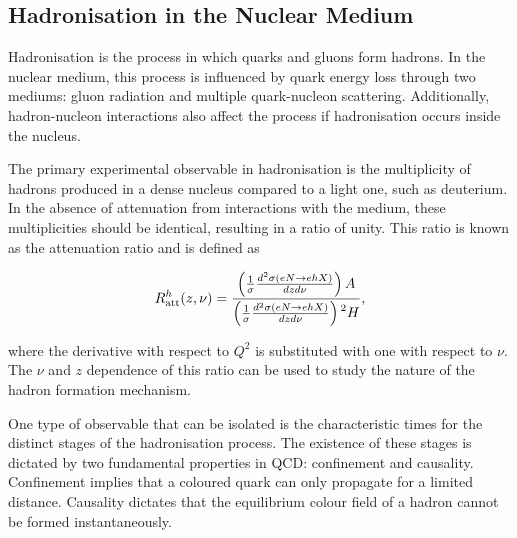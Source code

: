 \subsection{Hadronisation in the Nuclear Medium}
\label{10.30::hadronisation_in_the_nuclear_medium}
    Hadronisation is the process in which quarks and gluons form hadrons.
    In the nuclear medium, this process is influenced by quark energy loss through two mediums: gluon radiation and multiple quark-nucleon scattering.
    Additionally, hadron-nucleon interactions also affect the process if hadronisation occurs inside the nucleus.

    The primary experimental observable in hadronisation is the multiplicity of hadrons produced in a dense nucleus compared to a light one, such as deuterium.
    In the absence of attenuation from interactions with the medium, these multiplicities should be identical, resulting in a ratio of unity.
    This ratio is known as the attenuation ratio and is defined as

    \begin{equation*}
        R^h_{\text{att}}(z,\nu) = \frac
            {\left( \frac{1}{\sigma} \frac{d^2\sigma(eN \rightarrow ehX)}{dzd\nu} \right)A}
            {\left( \frac{1}{\sigma} \frac{d^2\sigma(eN \rightarrow ehX)}{dzd\nu} \right){\prescript{2}{}{H}}},
    \end{equation*}

    where the derivative with respect to $Q^2$ is substituted with one with respect to $\nu$.
    The $\nu$ and $z$ dependence of this ratio can be used to study the nature of the hadron formation mechanism.

    One type of observable that can be isolated is the characteristic times for the distinct stages of the hadronisation process.
    The existence of these stages is dictated by two fundamental properties in QCD: confinement and causality.
    Confinement implies that a coloured quark can only propagate for a limited distance.
    Causality dictates that the equilibrium colour field of a hadron cannot be formed instantaneously.

    
    
    
